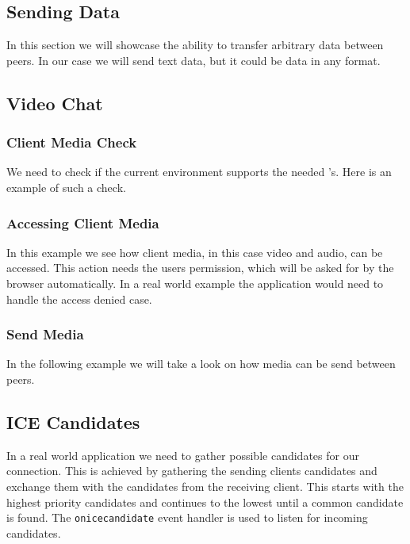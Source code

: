 \subsection{Sending Data}
In this section we will showcase the ability to transfer arbitrary data between peers. In our case we will send text data, but it could be data in any format.



\subsection{Video Chat}

\subsubsection{Client Media Check}
We need to check if the current environment supports the needed 's. Here is an example of such a check.


\subsubsection{Accessing Client Media}
In this example we see how client media, in this case video and audio, can be accessed. This action needs the users permission, which will be asked for by the browser automatically. In a real world example the application would need to handle the access denied case.



\subsubsection{Send Media}
In the following example we will take a look on how media can be send between peers.



\subsection{ICE Candidates}
In a real world application we need to gather possible  candidates for our connection. This is achieved by gathering the sending clients  candidates and exchange them with the  candidates from the receiving client. This starts with the highest priority candidates and continues to the lowest until a common candidate is found. The \lstinline[basicstyle=\ttfamily\color{black}]|onicecandidate| event handler is used to listen for incoming  candidates.

